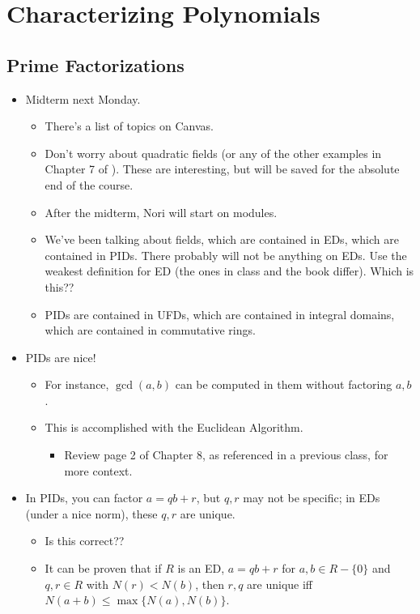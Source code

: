 \documentclass[../notes.tex]{subfiles}
\begin{document}
\chapter{Characterizing Polynomials}
\section{Prime Factorizations}
\begin{itemize}
    \item {}Midterm next Monday.
    \begin{itemize}
        \item There's a list of topics on Canvas.
        \item Don't worry about quadratic fields (or any of the other examples in Chapter 7 of \textcite{bib:DummitFoote}). These are interesting, but will be saved for the absolute end of the course.
        \item After the midterm, Nori will start on modules.
        \item We've been talking about fields, which are contained in EDs, which are contained in PIDs. There probably will not be anything on EDs. Use the weakest definition for ED (the ones in class and the book differ). Which is this??
        \item PIDs are contained in UFDs, which are contained in integral domains, which are contained in commutative rings.
    \end{itemize}
    \item PIDs are nice!
    \begin{itemize}
        \item For instance, $\gcd(a,b)$ can be computed in them without factoring $a,b$.
        \item This is accomplished with the Euclidean Algorithm.
        \begin{itemize}
            \item Review page 2 of Chapter 8, as referenced in a previous class, for more context.
        \end{itemize}
    \end{itemize}
    \item In PIDs, you can factor $a=qb+r$, but $q,r$ may not be specific; in EDs (under a nice norm), these $q,r$ are unique.
    \begin{itemize}
        \item Is this correct??
        \item It can be proven that if $R$ is an ED, $a=qb+r$ for $a,b\in R-\{0\}$ and $q,r\in R$ with $N(r)<N(b)$, then $r,q$ are unique iff $N(a+b)\leq\max\{N(a),N(b)\}$.

\end{itemize}
\end{itemize}
\end{document}
